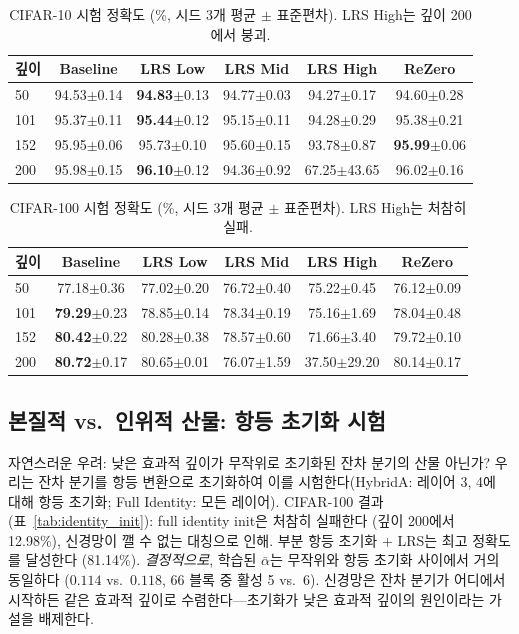 \documentclass{bmvc2k}
\begin{document}
\begin{table}[!ht]
\centering
\small
\caption{CIFAR-10 시험 정확도 (\%, 시드 3개 평균 $\pm$ 표준편차). LRS High는 깊이 200에서 붕괴.}
\label{tab:cifar10}
\begin{tabular}{lccccc}
\toprule
\textbf{깊이} & \textbf{Baseline} & \textbf{LRS Low} & \textbf{LRS Mid} & \textbf{LRS High} & \textbf{ReZero} \\
\midrule
50  & 94.53$\pm$0.14 & \textbf{94.83}$\pm$0.13 & 94.77$\pm$0.03 & 94.27$\pm$0.17 & 94.60$\pm$0.28 \\
101 & 95.37$\pm$0.11 & \textbf{95.44}$\pm$0.12 & 95.15$\pm$0.11 & 94.28$\pm$0.29 & 95.38$\pm$0.21 \\
152 & 95.95$\pm$0.06 & 95.73$\pm$0.10 & 95.60$\pm$0.15 & 93.78$\pm$0.87 & \textbf{95.99}$\pm$0.06 \\
200 & 95.98$\pm$0.15 & \textbf{96.10}$\pm$0.12 & 94.36$\pm$0.92 & 67.25$\pm$43.65 & 96.02$\pm$0.16 \\
\bottomrule
\end{tabular}
\end{table}

\begin{table}[!ht]
\centering
\small
\caption{CIFAR-100 시험 정확도 (\%, 시드 3개 평균 $\pm$ 표준편차). LRS High는 처참히 실패.}
\label{tab:cifar100}
\begin{tabular}{lccccc}
\toprule
\textbf{깊이} & \textbf{Baseline} & \textbf{LRS Low} & \textbf{LRS Mid} & \textbf{LRS High} & \textbf{ReZero} \\
\midrule
50  & 77.18$\pm$0.36 & 77.02$\pm$0.20 & 76.72$\pm$0.40 & 75.22$\pm$0.45 & 76.12$\pm$0.09 \\
101 & \textbf{79.29}$\pm$0.23 & 78.85$\pm$0.14 & 78.34$\pm$0.19 & 75.16$\pm$1.69 & 78.04$\pm$0.48 \\
152 & \textbf{80.42}$\pm$0.22 & 80.28$\pm$0.38 & 78.57$\pm$0.60 & 71.66$\pm$3.40 & 79.72$\pm$0.10 \\
200 & \textbf{80.72}$\pm$0.17 & 80.65$\pm$0.01 & 76.07$\pm$1.59 & 37.50$\pm$29.20 & 80.14$\pm$0.17 \\
\bottomrule
\end{tabular}
\end{table}

\subsection{본질적 vs.\ 인위적 산물: 항등 초기화 시험}
\label{sec:identity_init}

자연스러운 우려: 낮은 효과적 깊이가 무작위로 초기화된 잔차 분기의 산물 아닌가? 우리는 잔차 분기를 항등 변환으로 초기화하여 이를 시험한다(HybridA: 레이어 3, 4에 대해 항등 초기화; Full Identity: 모든 레이어). CIFAR-100 결과(표~\ref{tab:identity_init}): full identity init은 처참히 실패한다 (깊이 200에서 12.98\%), 신경망이 깰 수 없는 대칭으로 인해. 부분 항등 초기화 + LRS는 최고 정확도를 달성한다 (81.14\%). \emph{결정적으로}, 학습된 $\bar{\alpha}$는 무작위와 항등 초기화 사이에서 거의 동일하다 ($0.114$ vs.\ $0.118$, 66 블록 중 활성 5 vs.\ 6). 신경망은 잔차 분기가 어디에서 시작하든 같은 효과적 깊이로 수렴한다---초기화가 낮은 효과적 깊이의 원인이라는 가설을 배제한다.
\end{document}
